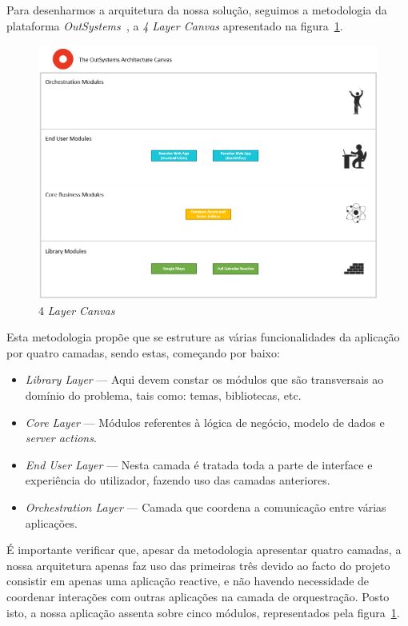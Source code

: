 Para desenharmos a arquitetura da nossa solução, seguimos a metodologia da plataforma \textit{OutSystems~\cite{outsystems}}, a \textit{4 Layer Canvas} apresentado na figura~\ref{fig:4lc}.

\begin{figure}[H]
  \centering 
  \includegraphics[scale=0.5]{figures/4LayerCanvas.png}
  \caption{4 \textit{Layer Canvas}}\label{fig:4lc}
\end{figure}

Esta metodologia propõe que se estruture as várias funcionalidades da aplicação por quatro camadas, sendo estas, começando por baixo: 

\begin{itemize}
    \item \textit{Library Layer} --- Aqui devem constar os módulos que são transversais ao domínio do problema, tais como: temas, bibliotecas, etc. 
    \item \textit{Core Layer} --- Módulos referentes à lógica de negócio, modelo de dados e \textit{server actions}. 
    \item \textit{End User Layer} --- Nesta camada é tratada toda a parte de interface e experiência do utilizador, fazendo uso das camadas anteriores. 
    \item \textit{Orchestration Layer} --- Camada que coordena a comunicação entre várias aplicações. 
\end{itemize}

É importante verificar que, apesar da metodologia apresentar quatro camadas, 
a nossa arquitetura apenas faz uso das primeiras três devido ao facto do projeto consistir em apenas uma aplicação reactive, 
e não havendo necessidade de coordenar interações com outras aplicações na camada de orquestração. 
Posto isto, a nossa aplicação assenta sobre cinco módulos, representados pela figura~\ref{fig:4lc}.

